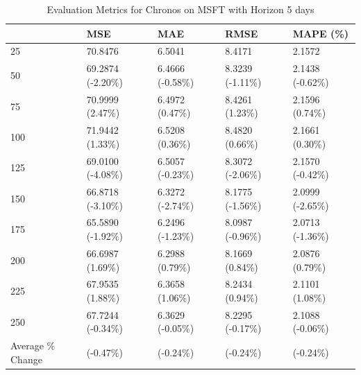 \begin{table}
\caption{Evaluation Metrics for Chronos on MSFT with Horizon 5 days}
\label{tab:chronos_base_MSFT_h5_metrics}
\begin{tabular}{lllll}
\toprule
 & MSE & MAE & RMSE & MAPE (\%) \\
\midrule
25 & 70.8476 & 6.5041 & 8.4171 & 2.1572 \\
50 & 69.2874 (-2.20\%) & 6.4666 (-0.58\%) & 8.3239 (-1.11\%) & 2.1438 (-0.62\%) \\
75 & 70.9999 (2.47\%) & 6.4972 (0.47\%) & 8.4261 (1.23\%) & 2.1596 (0.74\%) \\
100 & 71.9442 (1.33\%) & 6.5208 (0.36\%) & 8.4820 (0.66\%) & 2.1661 (0.30\%) \\
125 & 69.0100 (-4.08\%) & 6.5057 (-0.23\%) & 8.3072 (-2.06\%) & 2.1570 (-0.42\%) \\
150 & 66.8718 (-3.10\%) & 6.3272 (-2.74\%) & 8.1775 (-1.56\%) & 2.0999 (-2.65\%) \\
175 & 65.5890 (-1.92\%) & 6.2496 (-1.23\%) & 8.0987 (-0.96\%) & 2.0713 (-1.36\%) \\
200 & 66.6987 (1.69\%) & 6.2988 (0.79\%) & 8.1669 (0.84\%) & 2.0876 (0.79\%) \\
225 & 67.9535 (1.88\%) & 6.3658 (1.06\%) & 8.2434 (0.94\%) & 2.1101 (1.08\%) \\
250 & 67.7244 (-0.34\%) & 6.3629 (-0.05\%) & 8.2295 (-0.17\%) & 2.1088 (-0.06\%) \\
Average \% Change & (-0.47\%) & (-0.24\%) & (-0.24\%) & (-0.24\%) \\
\bottomrule
\end{tabular}
\end{table}
